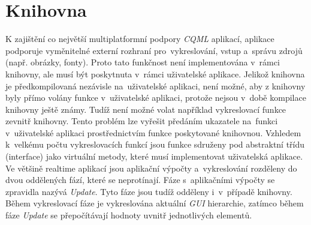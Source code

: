 \documentclass[11pt,twoside,a4paper]{book}
\begin{document}
\section{\label{SEC:libI}Knihovna}
K zajištění co největší multiplatformní podpory \textit{CQML} aplikací, aplikace podporuje vyměnitelné externí rozhraní pro~vykreslování, vstup a~správu zdrojů (např. obrázky, fonty). Proto tato funkčnost není implementována v~rámci knihovny, ale musí být poskytnuta v~rámci uživatelské aplikace. 
Jelikož knihovna je předkompilovaná nezávisle na~uživatelské aplikaci, není možné, aby z knihovny byly přímo volány funkce v~uživatelské aplikaci, protože nejsou v~době kompilace knihovny ještě známy. Tudíž není možné volat například vykreslovací funkce zevnitř knihovny. Tento problém lze vyřešit předáním ukazatele na~funkci v~uživatelské aplikaci prostřednictvím funkce poskytované knihovnou. Vzhledem k~velkému počtu vykreslovacích funkcí jsou funkce sdruženy pod abstraktní třídu (interface) jako virtuální metody, které musí implementovat uživatelská aplikace.\\
Ve většině realtime aplikací jsou aplikační výpočty a~vykreslování rozděleny do dvou oddělených fází, které se neprotínají. Fáze s~aplikačními výpočty se zpravidla nazývá \textit{Update}. Tyto fáze jsou tudíž odděleny i~v~případě knihovny. Během vykreslovací fáze je vykreslována aktuální \textit{GUI} hierarchie, zatímco během fáze \textit{Update} se přepočítávají hodnoty uvnitř jednotlivých elementů.\\
\end{document}

